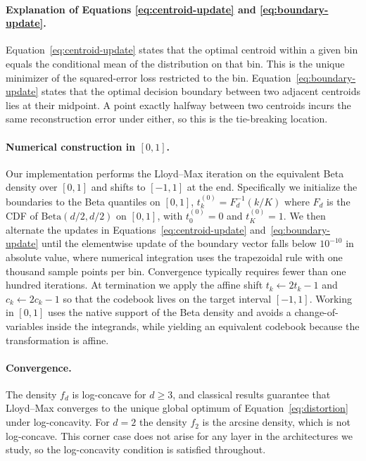 \paragraph{Explanation of Equations \ref{eq:centroid-update}
and \ref{eq:boundary-update}.}
Equation~\ref{eq:centroid-update} states that the optimal centroid within a
given bin equals the conditional mean of the distribution on that bin. This
is the unique minimizer of the squared-error loss restricted to the bin.
Equation~\ref{eq:boundary-update} states that the optimal decision
boundary between two adjacent centroids lies at their midpoint. A point
exactly halfway between two centroids incurs the same reconstruction error
under either, so this is the tie-breaking location.

\paragraph{Numerical construction in $[0, 1]$.}
Our implementation performs the Lloyd--Max iteration on the equivalent
Beta density over $[0, 1]$ and shifts to $[-1, 1]$ at the end. Specifically
we initialize the boundaries to the Beta quantiles on $[0, 1]$,
$t_k^{(0)} = F_d^{-1}(k/K)$ where $F_d$ is the CDF of $\mathrm{Beta}(d/2,
d/2)$ on $[0, 1]$, with $t_0^{(0)} = 0$ and $t_K^{(0)} = 1$. We then
alternate the updates in Equations~\ref{eq:centroid-update}
and~\ref{eq:boundary-update} until the elementwise update of the
boundary vector falls below $10^{-10}$ in absolute value, where
numerical integration uses the trapezoidal rule with one thousand sample
points per bin. Convergence typically requires fewer than one hundred
iterations. At
termination we apply the affine shift $t_k \leftarrow 2 t_k - 1$ and
$c_k \leftarrow 2 c_k - 1$ so that the codebook lives on the target
interval $[-1, 1]$. Working in $[0, 1]$ uses the native support of the
Beta density and avoids a change-of-variables inside the integrands, while
yielding an equivalent codebook because the transformation is affine.

\paragraph{Convergence.}
The density $f_d$ is log-concave for $d \geq 3$, and classical results
\citep{fleischer1964, kieffer1983} guarantee that Lloyd--Max converges to
the unique global optimum of Equation~\ref{eq:distortion} under
log-concavity. For $d = 2$ the density $f_2$ is the arcsine density, which
is not log-concave. This corner case does not arise for any layer in the
architectures we study, so the log-concavity condition is satisfied
throughout.

